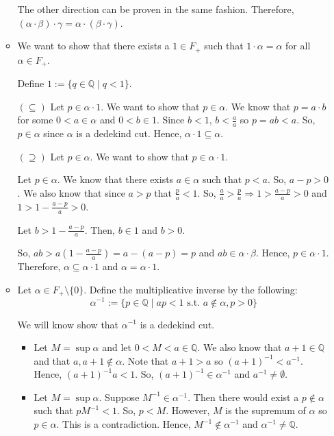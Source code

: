 \documentclass[12pt]{article}
\begin{document}
\begin{enumerate}[start=1,label={\bfseries Problem \arabic*:},leftmargin=1in]
\begin{itemize}
        The other direction can be proven in the same fashion. Therefore, $(\alpha \cdot \beta) \cdot \gamma = \alpha \cdot (\beta \cdot \gamma)$.

        \item We want to show that there exists a $1 \in F_{+}$ such that $1 \cdot \alpha = \alpha$ for all $\alpha \in F_{+}$.
        
        Define $1 := \{ q \in \mathbb{Q} \mid q < 1 \}$. 

        $(\subseteq)$ Let $p \in \alpha \cdot 1$. We want to show that $p \in \alpha$. 
        We know that $p = a \cdot b$ for some $0 < a \in \alpha$ and $0 < b \in 1$. Since $b < 1$,
        $b < \frac{a}{a}$ so $p = ab < a$. So, $p \in \alpha$ since $\alpha$ is a dedekind cut. 
        Hence, $\alpha \cdot 1 \subseteq \alpha$.

        $(\supseteq)$ Let $p \in \alpha$. We want to show that $p \in \alpha \cdot 1$.

        Let $p \in \alpha$. We know that there exists $a \in \alpha$ such that $p < a$. 
        So, $a - p > 0$. We also know that since $a > p$ that $\frac{p}{a} < 1$.
        So, $\frac{a}{a} > \frac{p}{a} \Rightarrow 1 > \frac{a-p}{a} > 0$ and $1 > 1 - \frac{a-p}{a} > 0$. 

        Let $b > 1 - \frac{a-p}{a}$. Then, $b \in 1$ and $b > 0$.

        So, $ab > a(1 - \frac{a-p}{a}) = a - (a-p) = p$ and $ab \in \alpha \cdot \beta$. Hence, $p \in \alpha \cdot 1$. Therefore, $\alpha \subseteq \alpha \cdot 1$ and $\alpha = \alpha \cdot 1$.
        
        \item Let $\alpha \in F_{+}\setminus \{0\}$. Define the multiplicative inverse by the following:
        \[
            \alpha^{-1} := \{ p \in \mathbb{Q} \mid ap < 1 \text{ s.t. } a \not \in \alpha, p > 0\}
        \]

        We will know show that $\alpha^{-1}$ is a dedekind cut. 
        \begin{itemize}
            \item Let $M = \sup \alpha$ and let $0 < M < a \in \mathbb{Q}$. We also know that $a + 1 \in \mathbb{Q}$ and that $a, a+1 \not \in \alpha$. 
            Note that $a+1>a$ so $(a+1)^{-1} < a^{-1}$. Hence, $(a+1)^{-1}a < 1$. So, $(a+1)^{-1} \in \alpha^{-1}$ and $a^{-1} \neq \emptyset$. 
            
            \item Let $M = \sup \alpha$. Suppose $M^{-1} \in \alpha^{-1}$. Then there would exist a $p \not \in \alpha$ such that $pM^{-1} < 1$. 
            So, $p < M$. However, $M$ is the supremum of $\alpha$ so $p \in \alpha$. This is a contradiction. Hence, $M^{-1} \not \in \alpha^{-1}$ and $\alpha^{-1} \neq \mathbb{Q}$.


\end{itemize}
\end{itemize}
\end{enumerate}
\end{document}
